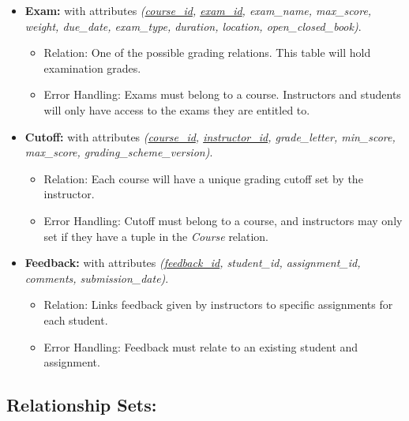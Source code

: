 \documentclass[12pt]{article}
\begin{document}
\begin{itemize}
    \item \textbf{Exam:} with attributes \textit{(\underline{course\_id}, \underline{exam\_id}, exam\_name, max\_score, weight, due\_date, exam\_type, duration, location, open\_closed\_book)}.
    \begin{itemize}
        \item Relation: One of the possible grading relations. This table will hold examination grades.
        \item Error Handling: Exams must belong to a course. Instructors and students will only have access to the exams they are entitled to.
    \end{itemize}

    \item \textbf{Cutoff:} with attributes \textit{(\underline{course\_id}, \underline{instructor\_id}, grade\_letter, min\_score, max\_score, grading\_scheme\_version)}.
    \begin{itemize}
        \item Relation: Each course will have a unique grading cutoff set by the instructor.
        \item Error Handling: Cutoff must belong to a course, and instructors may only set if they have a tuple in the \textit{Course} relation.
    \end{itemize}

    \item \textbf{Feedback:} with attributes \textit{(\underline{feedback\_id}, student\_id, assignment\_id, comments, submission\_date)}.
    \begin{itemize}
        \item Relation: Links feedback given by instructors to specific assignments for each student.
        \item Error Handling: Feedback must relate to an existing student and assignment.
    \end{itemize}
    
\end{itemize}

\subsection*{Relationship Sets:}
\end{document}
